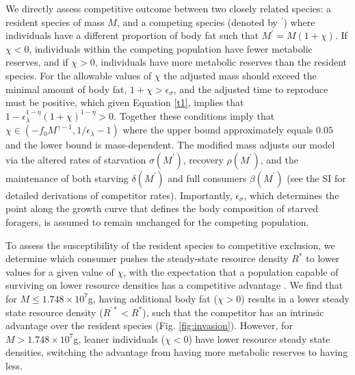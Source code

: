 \documentclass[twocolumn,preprintnumbers,amsmath,amssymb,superscriptaddress]{revtex4}
\begin{document}
We directly assess competitive outcome between two closely related species: a resident species of mass $M$, and a competing species (denoted by $^\prime$) where individuals have a different proportion of body fat such that $M^\prime=M(1+\chi)$.
If $\chi < 0$, individuals within the competing population have fewer metabolic reserves, and if $\chi>0$, individuals have more metabolic reserves than the resident species.
For the allowable values of $\chi$ the adjusted mass should exceed the minimal amount of body fat, $1+\chi>\epsilon_{\sigma}$, and the adjusted time to reproduce must be positive, which given Equation \ref{t1}, implies that $1-\epsilon_{\lambda}^{1-\eta}\left(1+\chi\right)^{1-\eta}>0$.
Together these conditions imply that $\chi\in(-f_0M^{\gamma-1},1/\epsilon_{\lambda}-1)$ where the upper bound approximately equals $0.05$ and the lower bound is mass-dependent.
The modified mass adjusts our model via the altered rates of starvation $\sigma(M^\prime)$, recovery $\rho(M^\prime)$, and the maintenance of both starving $\delta(M^\prime)$ and full consumers $\beta(M^\prime)$ (see the SI for detailed derivations of competitor rates).
Importantly, $\epsilon_\sigma$, which determines the point along the growth
curve that defines the body composition of starved foragers, is assumed to
remain unchanged for the competing population.

To assess the susceptibility of the resident species to competitive exclusion, we determine which consumer pushes the steady-state resource density $R^*$ to lower values for a given value of $\chi$, with the expectation that a population capable of surviving on lower resource densities has a competitive advantage \citep{tilman1981}.
We find that for $M\leq 1.748\times10^7$g, having additional body fat ($\chi > 0$) results in a lower steady state resource density ($R^{\prime *}<R^*$), such that the competitor has an intrinsic advantage over the resident species (Fig. \ref{fig:invasion}).
However, for $M> 1.748\times10^7$g, leaner individuals ($\chi < 0$) have lower resource steady state densities, switching the advantage from having more metabolic reserves to having less.

\end{document}
